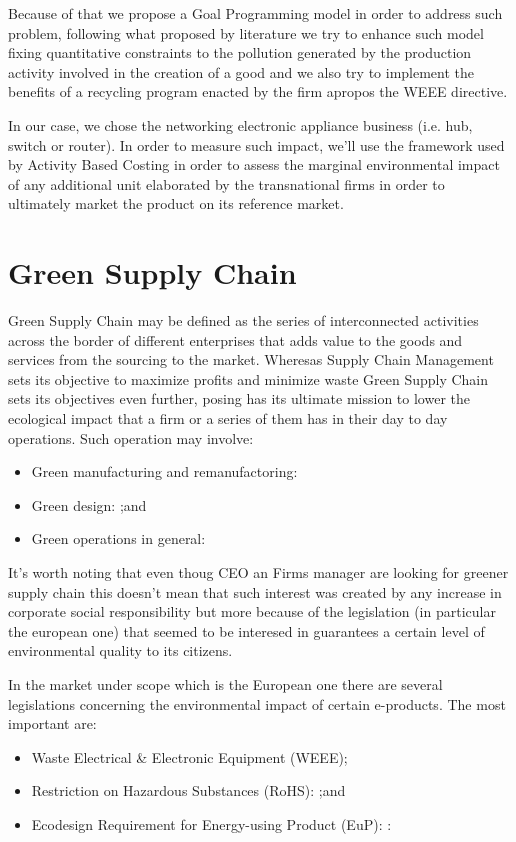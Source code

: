 \documentclass{article}
\begin{document}
Because of that we propose a Goal Programming model in order to address such problem, following what proposed by literature we try to enhance such model fixing quantitative constraints to the pollution generated by the production activity involved in the creation of a good and we also try to implement the benefits of a recycling program enacted by the firm apropos the WEEE directive.

In our case, we chose the networking electronic appliance business (i.e. hub, switch or router). In order to measure such impact, we'll use the framework used by Activity Based Costing in order to assess the marginal environmental impact of any additional unit elaborated by the transnational firms in order to ultimately market the product on its reference market.

\section{Green Supply Chain}
Green Supply Chain may be defined as the series of interconnected activities across the border of different enterprises that adds value to the goods and services from the sourcing to the market. Wheresas Supply Chain Management sets its objective to maximize profits and minimize waste Green Supply Chain sets its objectives even further, posing has its ultimate mission to lower the ecological impact that a firm or a series of them has in their day to day operations. Such operation may involve:
\begin{itemize}
    \item Green manufacturing and remanufactoring:
    \item Green design: ;and
    \item Green operations in general:
\end{itemize}

It's worth noting that even thoug CEO an Firms manager are looking for greener supply chain this doesn't mean that such interest was created by any increase in corporate social responsibility but more because of the legislation (in particular the european one) that seemed to be interesed in guarantees a certain level of environmental quality to its citizens.

In the market under scope which is the European one there are several legislations concerning the environmental impact of certain e-products. The most important are:
\begin{itemize}
    \item Waste Electrical \& Electronic Equipment (WEEE);
    \item Restriction on Hazardous Substances (RoHS): ;and
    \item Ecodesign Requirement for Energy-using Product (EuP): :
\end{itemize}
\end{document}
